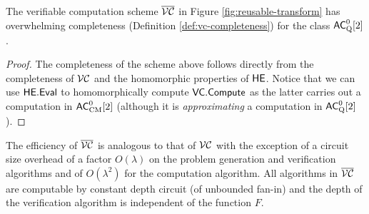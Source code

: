 \begin{corollary}
The verifiable computation scheme $\overline{{\cal VC}}$ in Figure \ref{fig:reusable-transform} has overwhelming completeness (Definition \ref{def:vc-completeness}) for the class ${\mathsf{AC}}^0_{\text{Q}}[2]$.
\end{corollary}
\begin{proof}
The completeness of the scheme above follows directly from the completeness of ${\cal VC}$ and the homomorphic properties of $\mathsf{HE}$.
Notice that we can use $\mathsf{HE.Eval}$ to homomorphically compute $\mathsf{VC.Compute}$ as the latter carries out a computation in ${\mathsf{AC}}^0_{\text{CM}}[2]$ (although it is \textit{approximating} a computation in ${\mathsf{AC}}^0_{\text{Q}}[2]$). 
\end{proof}

\begin{remark}
The efficiency of $\overline{{\cal VC}}$ is analogous to that of ${\cal VC}$ with the exception of a circuit size overhead of a factor $O(\lambda)$ on the problem generation and verification algorithms and of $O(\lambda^2)$ for the computation algorithm.
All algorithms in $\overline{{\cal VC}}$ are computable by constant depth circuit (of unbounded fan-in) and the depth of the verification algorithm is independent of the function $F$.
\end{remark}


